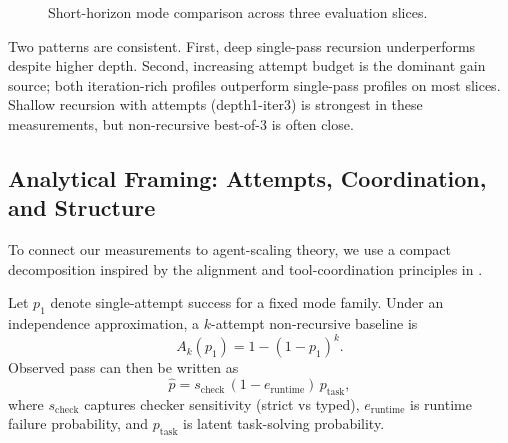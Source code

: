 \documentclass[11pt]{article}
\begin{document}
\begin{figure}[t]
\centering
{}
\caption{Short-horizon mode comparison across three evaluation slices.}
\label{fig:short-horizon-modes}
\end{figure}

Two patterns are consistent. First, deep single-pass recursion underperforms despite higher depth. Second, increasing attempt budget is the dominant gain source; both iteration-rich profiles outperform single-pass profiles on most slices. Shallow recursion with attempts (depth1-iter3) is strongest in these measurements, but non-recursive best-of-3 is often close.

\subsection{Analytical Framing: Attempts, Coordination, and Structure}
To connect our measurements to agent-scaling theory, we use a compact decomposition inspired by the alignment and tool-coordination principles in \cite{kim2025scaling,google2026agentscaling}.

Let \(p_1\) denote single-attempt success for a fixed mode family. Under an independence approximation, a \(k\)-attempt non-recursive baseline is
\[
A_k(p_1) = 1 - (1-p_1)^k.
\]
Observed pass can then be written as
\[
\hat p = s_{\text{check}}\,(1-e_{\text{runtime}})\,p_{\text{task}},
\]
where \(s_{\text{check}}\) captures checker sensitivity (strict vs typed), \(e_{\text{runtime}}\) is runtime failure probability, and \(p_{\text{task}}\) is latent task-solving probability.
\end{document}
